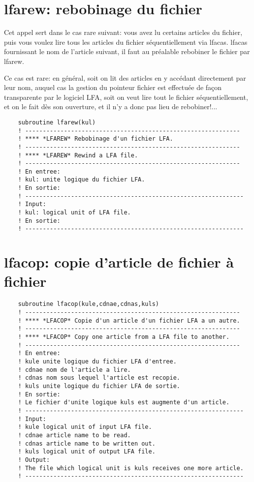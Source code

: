 \documentclass[10pt,french]{book}
\begin{document}
\section{lfarew: rebobinage du fichier}

\p Cet appel sert dans le cas rare suivant: vous avez lu
certains articles du fichier, puis vous voulez lire tous les articles
du fichier séquentiellement via lfacas. lfacas fournissant 
le nom de l'article suivant, il faut au préalable rebobiner
le fichier par lfarew.

\p Ce cas est rare: en général, soit on lit des articles en y accédant
directement par leur nom, auquel cas la gestion
du pointeur fichier est effectuée de façon 
transparente par le logiciel LFA, soit on veut lire tout le fichier
séquentiellement, et on le fait dès son ouverture,  et il
n'y a donc pas lieu de rebobiner!... 
 
 
 
\begin{verbatim}
	subroutine lfarew(kul)
	! -------------------------------------------------------------                
	! **** *LFAREW* Rebobinage d'un fichier LFA.
	! -------------------------------------------------------------                
	! **** *LFAREW* Rewind a LFA file.
	! -------------------------------------------------------------                
	! En entree:
	! kul: unite logique du fichier LFA.
	! En sortie:
	! --------------------------------------------------------------
	! Input:
	! kul: logical unit of LFA file.
	! En sortie:
	! --------------------------------------------------------------
\end{verbatim}

\section{lfacop: copie d'article de fichier à fichier}
\begin{verbatim}
	subroutine lfacop(kule,cdnae,cdnas,kuls)
	! -------------------------------------------------------------                
	! **** *LFACOP* Copie d'un article d'un fichier LFA a un autre.
	! -------------------------------------------------------------                
	! **** *LFACOP* Copy one article from a LFA file to another.
	! -------------------------------------------------------------                
	! En entree:
	! kule unite logique du fichier LFA d'entree.
	! cdnae nom de l'article a lire.
	! cdnas nom sous lequel l'article est recopie.
	! kuls unite logique du fichier LFA de sortie.
	! En sortie:
	! Le fichier d'unite logique kuls est augmente d'un article.
	! --------------------------------------------------------------
	! Input:
	! kule logical unit of input LFA file.
	! cdnae article name to be read.
	! cdnas article name to be written out.
	! kuls logical unit of output LFA file.
	! Output:
	! The file which logical unit is kuls receives one more article.
	! --------------------------------------------------------------
\end{verbatim}
\end{document}
